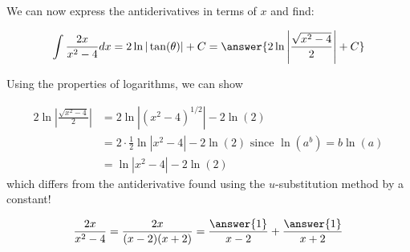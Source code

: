 \documentclass{ximera}
\begin{document}
\begin{exercise}
\begin{exercise}
\begin{exercise}
\begin{exercise}
\begin{exercise}
We can now express the antiderivatives in terms of $x$ and find:
 
\[
\int \frac{2x}{x^2-4} dx =  2 \ln|\tan(\theta)|+C = \answer{2 \ln \left| \frac{\sqrt{x^2-4}}{2} \right| +C}
\]
 
\begin{exercise}
Using the properties of logarithms, we can show
 
\begin{align*}
2 \ln \left| \frac{ \sqrt{x^2-4} }{2} \right| & = 2 \ln \left|(x^2-4)^{1/2} \right| - 2 \ln(2) \\
& = 2 \cdot \frac{1}{2} \ln \left| x^2-4 \right| - 2 \ln(2) \textrm{ since } \ln\left(a^b\right) = b \ln(a) \\
& =  \ln \left|x^2-4 \right| - 2 \ln(2)
\end{align*}
which differs from the antiderivative found using the $u$-substitution method by a constant!
 
\end{exercise}
\end{exercise}
\end{exercise}
\end{exercise}
\end{exercise}
 
\[
\frac{2x}{x^2-4} = \frac{2x}{(x-2)(x+2)} = \frac{\answer{1}}{x-2}+\frac{\answer{1}}{x+2}
\]
  
\end{exercise}
\end{document}
